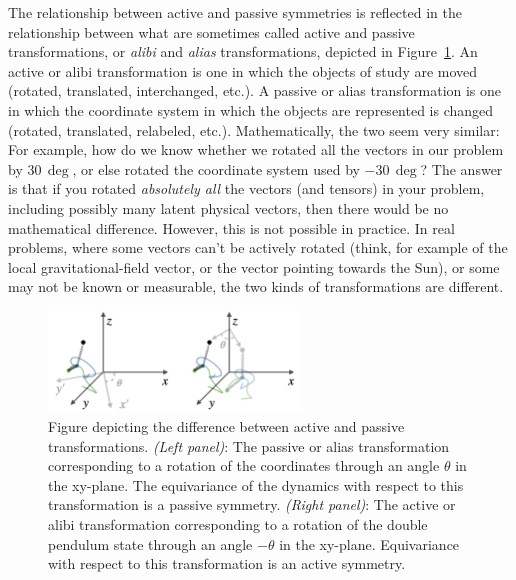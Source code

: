 \documentclass[accepted]{article}
\newcommand{\figref}[1]{Figure~\ref{#1}}
\begin{document}
The relationship between active and passive symmetries is reflected in the relationship between what are sometimes called active and passive transformations, or \emph{alibi} and \emph{alias} transformations, depicted in \figref{fig:alias}.
An active or alibi transformation is one in which the objects of study are moved (rotated, translated, interchanged, etc.).
A passive or alias transformation is one in which the coordinate system in which the objects are represented is changed (rotated, translated, relabeled, etc.).
Mathematically, the two seem very similar:
For example, how do we know whether we rotated all the vectors in our problem by $30\,\deg$, or else rotated the coordinate system used by $-30\,\deg$?
The answer is that if you rotated \emph{absolutely all} the vectors (and tensors) in your problem, including possibly many latent physical vectors, then there would be no mathematical difference. However, this is not possible in practice. 
In real problems, where some vectors can't be actively rotated (think, for example of the local gravitational-field vector, or the vector pointing towards the Sun), or some may not be known or measurable, the two kinds of transformations are different.
\begin{figure}[t!]
    \centering
    \includegraphics[width=0.6\textwidth]{alias.png}
    \caption{Figure depicting the difference between active and passive transformations. \textsl{(Left panel)}: The passive or alias transformation corresponding to a rotation of the coordinates through an angle $\theta$ in the xy-plane. The equivariance of the dynamics with respect to this transformation is a passive symmetry. \textsl{(Right panel)}: The active or alibi transformation corresponding to a rotation of the double pendulum state through an angle $-\theta$ in the xy-plane. Equivariance with respect to this transformation is an active symmetry.}
    \label{fig:alias}
\end{figure}
\end{document}
